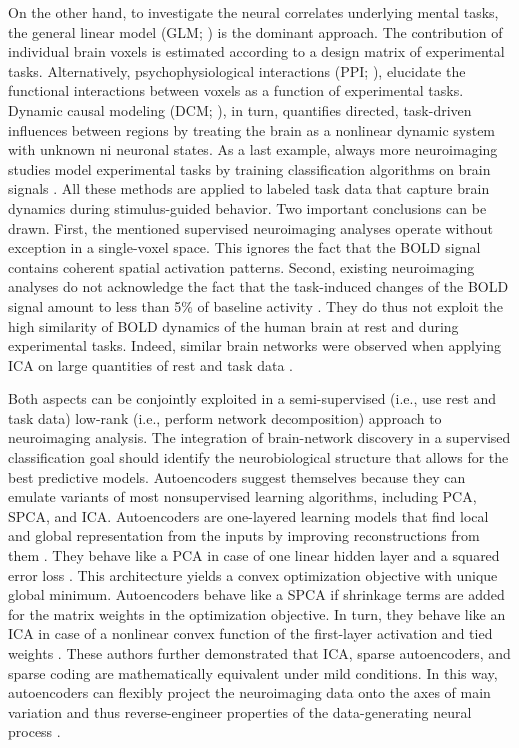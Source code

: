 \documentclass{article} %
\begin{document}
\linebreak

On the other hand, to investigate
the neural correlates underlying mental tasks,
the general linear model (GLM; \cite{friston94}) is the dominant approach.
The contribution of
individual brain voxels is estimated
according to a design matrix of experimental tasks.
Alternatively, psychophysiological interactions (PPI; \cite{friston97}),
elucidate the functional interactions between voxels as a function
of experimental tasks.
Dynamic causal modeling (DCM; \cite{stephan04}), in turn, quantifies directed,
task-driven influences between regions
by treating the brain as a nonlinear dynamic system with unknown
ni  neuronal states. As a last example, always more neuroimaging studies model
experimental tasks by training classification algorithms on brain signals
\cite{poldrack09decoding}.
All these methods are applied to labeled task data that capture brain dynamics
during stimulus-guided behavior.
Two important conclusions can be drawn.
First, the mentioned supervised neuroimaging analyses operate
without exception in a single-voxel space. This ignores the fact that the BOLD
signal contains coherent spatial activation patterns.
Second, existing neuroimaging analyses do not acknowledge the fact that the
task-induced changes of the BOLD signal amount to less than 5\%
of baseline activity \cite{fox07}. They do thus not exploit the high similarity
of BOLD dynamics of the human brain at rest and during experimental tasks.
Indeed, similar brain networks were observed when applying ICA on
large quantities of
rest and task data \cite{smith2009}.

\linebreak

Both aspects can be conjointly exploited in a 
semi-supervised (i.e., use rest and task data)
low-rank (i.e., perform network decomposition)
approach to neuroimaging analysis.
%
The integration of brain-network discovery in a 
supervised classification goal should identify the
neurobiological structure that allows for the best predictive models.
%
Autoencoders suggest themselves because they can emulate
variants of most nonsupervised learning algorithms,
including PCA, SPCA, and ICA.
Autoencoders
are one-layered learning models that find local and global
representation from the inputs
by improving reconstructions from them \cite{hinton06}.
%
They behave like a PCA
in case of one linear hidden layer and a squared error loss
\cite{baldi1989neural}.
This architecture yields a convex optimization objective
with unique global minimum.
Autoencoders behave like a SPCA if shrinkage terms are added for the
matrix weights in the optimization objective.
In turn, they behave like an ICA in case of a nonlinear convex
function of the first-layer activation and tied weights \cite{le2011ica}.
These authors further demonstrated that ICA, sparse autoencoders, and 
sparse coding are mathematically equivalent
under mild conditions.
In this way, autoencoders can flexibly project the neuroimaging data
onto the axes of main variation and thus
reverse-engineer properties of the data-generating
neural process \cite{olshausen96}.
\end{document}

